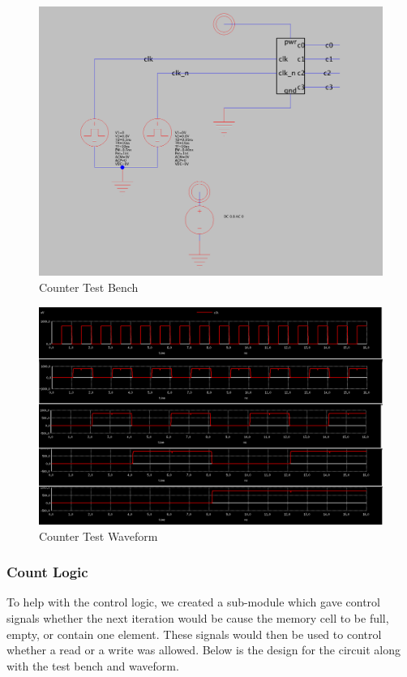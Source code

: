 \documentclass[a4paper]{article}
\begin{document}
\begin{figure}[H]
	\centering
	\includegraphics[scale=0.26]{counterTest}
	\caption{Counter Test Bench}
	\label{fig:counterTest}
\end{figure}

\begin{figure}[H]
	\centering
	\includegraphics[scale=0.26]{counterWaveform}
	\caption{Counter Test Waveform}
	\label{fig:counterWaveform}
\end{figure}


\subsubsection{Count Logic}
\label{sec:count_logic_design}

To help with the control logic, we created a sub-module which gave control signals whether the next iteration would be cause the memory cell to be full, empty, or contain one element. These signals would then be used to control whether a read or a write was allowed. Below is the design for the circuit along with the test bench and waveform.
\end{document}

